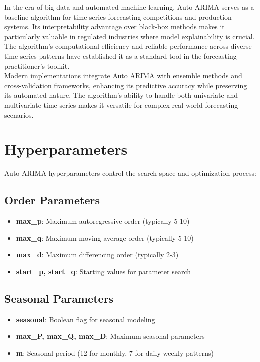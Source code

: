 In the era of big data and automated machine learning, Auto ARIMA serves as a baseline algorithm for time series forecasting competitions and production systems. Its interpretability advantage over black-box methods makes it particularly valuable in regulated industries where model explainability is crucial. The algorithm's computational efficiency and reliable performance across diverse time series patterns have established it as a standard tool in the forecasting practitioner's toolkit.\\

Modern implementations integrate Auto ARIMA with ensemble methods and cross-validation frameworks, enhancing its predictive accuracy while preserving its automated nature. The algorithm's ability to handle both univariate and multivariate time series makes it versatile for complex real-world forecasting scenarios.

\section{Hyperparameters}
\label{sec:hyperparameters}

Auto ARIMA hyperparameters control the search space and optimization process:

\subsection{Order Parameters}
\begin{itemize}
	\item \textbf{max\_p}: Maximum autoregressive order (typically 5-10)
	\item \textbf{max\_q}: Maximum moving average order (typically 5-10)  
	\item \textbf{max\_d}: Maximum differencing order (typically 2-3)
	\item \textbf{start\_p, start\_q}: Starting values for parameter search
\end{itemize}

\subsection{Seasonal Parameters}
\begin{itemize}
	\item \textbf{seasonal}: Boolean flag for seasonal modeling
	\item \textbf{max\_P, max\_Q, max\_D}: Maximum seasonal parameters
	\item \textbf{m}: Seasonal period (12 for monthly, 7 for daily weekly patterns)
\end{itemize}

